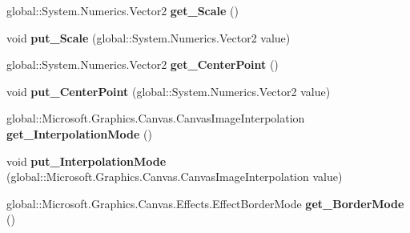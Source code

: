 \begin{DoxyCompactItemize}
global\+::\+System.\+Numerics.\+Vector2 {\bfseries get\+\_\+\+Scale} ()
\item 
\mbox{\label{interface_microsoft_1_1_graphics_1_1_canvas_1_1_effects_1_1_i_scale_effect_a2945fd65d3f7df0e167dd527632d4244}} 
void {\bfseries put\+\_\+\+Scale} (global\+::\+System.\+Numerics.\+Vector2 value)
\item 
\mbox{\label{interface_microsoft_1_1_graphics_1_1_canvas_1_1_effects_1_1_i_scale_effect_abaa43e3b0b5b6f89987efd1e0930c4fa}} 
global\+::\+System.\+Numerics.\+Vector2 {\bfseries get\+\_\+\+Center\+Point} ()
\item 
\mbox{\label{interface_microsoft_1_1_graphics_1_1_canvas_1_1_effects_1_1_i_scale_effect_ae77c17d958bfacfc7652816c2fc67522}} 
void {\bfseries put\+\_\+\+Center\+Point} (global\+::\+System.\+Numerics.\+Vector2 value)
\item 
\mbox{\label{interface_microsoft_1_1_graphics_1_1_canvas_1_1_effects_1_1_i_scale_effect_a4fe4bd90b0fa1dfcf5e3831f15e73a81}} 
global\+::\+Microsoft.\+Graphics.\+Canvas.\+Canvas\+Image\+Interpolation {\bfseries get\+\_\+\+Interpolation\+Mode} ()
\item 
\mbox{\label{interface_microsoft_1_1_graphics_1_1_canvas_1_1_effects_1_1_i_scale_effect_aaaff922db5597526bd069b5b3cfa1bf3}} 
void {\bfseries put\+\_\+\+Interpolation\+Mode} (global\+::\+Microsoft.\+Graphics.\+Canvas.\+Canvas\+Image\+Interpolation value)
\item 
\mbox{\label{interface_microsoft_1_1_graphics_1_1_canvas_1_1_effects_1_1_i_scale_effect_ac46828996e589095068e0beff4165185}} 
global\+::\+Microsoft.\+Graphics.\+Canvas.\+Effects.\+Effect\+Border\+Mode {\bfseries get\+\_\+\+Border\+Mode} ()
\item 
\mbox{\label{interface_microsoft_1_1_graphics_1_1_canvas_1_1_effects_1_1_i_scale_effect_a56c46fac62fdf0f627612c3363b495f4}} 

\end{DoxyCompactItemize}
